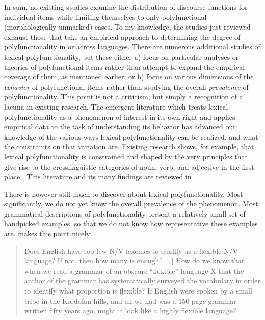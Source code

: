 In sum, no existing studies examine the distribution of discourse functions for individual items while limiting themselves to only polyfunctional (morphologically unmarked) cases. To my knowledge, the studies just reviewed exhaust those that take an empirical approach to determining the degree of polyfunctionality in or across languages. There are numerous additional studies of lexical polyfunctionality, but these either a) focus on particular analyses or theories of polyfunctional items rather than attempt to expand the empirical coverage of them, as mentioned earlier; or b) focus on various dimensions of the \emph{behavior} of polyfunctional items rather than studying the overall \emph{prevalence} of polyfunctionality. This point is not a criticism, but simply a recognition of a lacuna in existing research. The emergent literature which treats lexical polyfunctionality as a phenomenon of interest in its own right and applies empirical data to the task of understanding its behavior has advanced our knowledge of the various ways lexical polyfunctionality can be realized, and what the constraints on that variation are. Existing research shows, for example, that lexical polyfunctionality is constrained and shaped by the very principles that give rise to the crosslinguistic categories of noun, verb, and adjective in the first place \parencites{Croft2000}{Croft2005}{CroftLier2012}. This literature and its many findings are reviewed in .

There is however still much to discover about lexical polyfunctionality. Most significantly, we do not yet know the overall prevalence of the phenomenon. Most grammatical descriptions of polyfunctionality present a relatively small set of handpicked examples, so that we do not know how representative these examples are. \textcite[70]{Croft2001b} makes this point nicely:

\blockquote[{\cite[70]{Croft2001b}}]{Does English have too few N/V lexemes to qualify as a flexible N/V language? If not, then how many is enough? […] How do we know that when we read a grammar of an obscure \enquote{flexible} language X that the author of the grammar has systematically surveyed the vocabulary in order to identify what proportion is flexible? If English were spoken by a small tribe in the Kordofan hills, and all we had was a 150 page grammar written fifty years ago, might it look like a highly flexible language?}

